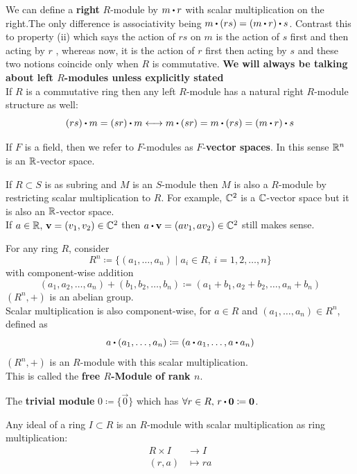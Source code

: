 \documentclass[../Main.tex]{subfiles}
\begin{document}
\Note We can define a \textbf{right} $R$-module by $m\rdot r$ with scalar multiplication on the right.The only difference is associativity being $m\rdot (rs) = (m\rdot r)\rdot s$. Contrast this to property (ii) which says the action of $rs$ on $m$ is the action of $s$ first and then acting by $r$ , whereas now, it is the action of $r$ first then acting by $s$ and these two notions coincide only when $R$ is commutative. \textbf{We will always be talking about left $R$-modules unless explicitly stated}\\
\Note If $R$ is a commutative ring then any left $R$-module has a natural right $R$-module structure as well:
\[(rs)\rdot m = (sr)\rdot m \longleftrightarrow m\rdot (sr) = m\rdot (rs) = (m\rdot r)\rdot s\]
\begin{dfn}[title =  \texorpdfstring{$F$}{F}-vector space]
	If $F$ is a field, then we refer to $F$-modules as $F$-\textbf{vector spaces}. In this sense $\mathbb{R}^n$ is an $\mathbb{R}$-vector space.
\end{dfn}
\Obs If $R\subset S$ is as subring and $M$ is an $S$-module then $M$ is also a $R$-module by restricting scalar multiplication to $R$. For example, $\mathbb{C}^2$ is a $\mathbb{C}$-vector space but it is also an $\mathbb{R}$-vector space. \\
If $a\in \mathbb{R},\, \mathbf{v} = (v_1,v_2)\in \mathbb{C}^2$ then $a\rdot \vv = (av_1,av_2)\in \C^2$ still makes sense.
\begin{example}
	For any ring $R$, consider
	\[R^n \coloneqq \{(a_1,\dots,a_n)\mid a_i\in R, \, i=1,2,\dots,n\}\]
	with component-wise addition 
	\[(a_1,a_2,\dots,a_n)+(b_1,b_2,\dots,b_n) \coloneqq (a_1+b_1,a_2+b_2,\dots,a_n+b_n)\]
	\Exr $(R^n,+)$ is an abelian group.\\
	Scalar multiplication is also component-wise, for $a\in R$ and $(a_1,\dots,a_n)\in R^n$, defined as
	\[a\rdot (a_1,\dots,a_n)\coloneqq (a\rdot a_1,\dots,a\rdot a_n)\]
	\Exr $(R^n,+)$ is an $R$-module with this scalar multiplication.\\
	This is called the \textbf{free $R$-Module of rank $n$}.
\end{example}
\begin{example}
	The \textbf{trivial module} $0\coloneqq \{\vec{0}\}$ which has $\forall r \in R, \, r\rdot \vec{0} \coloneqq \vec{0}$.
\end{example}
\begin{example}
	Any ideal of a ring $I\subset R$ is an $R$-module with scalar multiplication as  ring multiplication:
	\begin{align*}
	R \times I &\to I\\
	(r,a) &\mapsto ra
	\end{align*}
\end{example}
\end{document}
